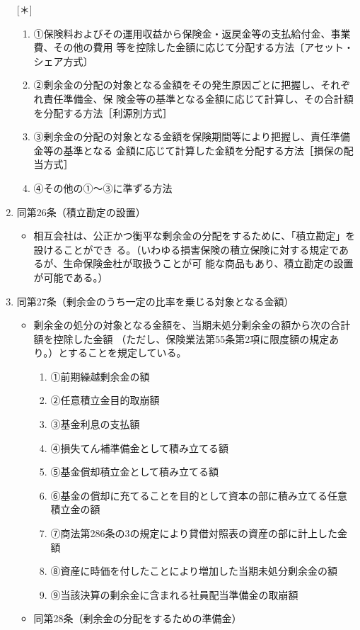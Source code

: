 \documentclass[report,gutter=10mm,fore-edge=10mm,uplatex,dvipdfmx]{jlreq}
\begin{document}
\begin{enumerate} [＊]
\begin{itemize}
\begin{enumerate} [ ]
 \item 
  ①保険料およびその運用収益から保険金・返戻金等の支払給付金、事業費、その他の費用
 等を控除した金額に応じて分配する方法〔アセット・シェア方式〕
 \item 
 ②剰余金の分配の対象となる金額をその発生原因ごとに把握し、それぞれ責任準備金、保
 険金等の基準となる金額に応じて計算し、その合計額を分配する方法［利源別方式］
 \item 
 ③剰余金の分配の対象となる金額を保険期間等により把握し、責任準備金等の基準となる
 金額に応じて計算した金額を分配する方法［損保の配当方式］
 \item 
 ④その他の①〜③に準ずる方法
\end{enumerate}
\end{itemize}
\item 同第26条（積立勘定の設置）
\begin{itemize}
 \item 相互会社は、公正かつ衡平な剰余金の分配をするために、「積立勘定」を設けることができ
 る。（いわゆる損害保険の積立保険に対する規定であるが、生命保険金杜が取扱うことが可
 能な商品もあり、積立勘定の設置が可能である。）
\end{itemize}
\item 同第27条（剰余金のうち一定の比率を乗じる対象となる金額）
\begin{itemize}
 \item 剰余金の処分の対象となる金額を、当期未処分剰余金の額から次の合計額を控除した金額
 （ただし、保険業法第55条第2項に限度額の規定あり。）とすることを規定している。
\begin{enumerate} [ ]
 \item  ①前期繰越剰余金の額
 \item ②任意積立金目的取崩額
\item ③基金利息の支払額
\item ④損失てん補準備金として積み立てる額
\item ⑤基金償却積立金として積み立てる額
\item ⑥基金の償却に充てることを目的として資本の部に積み立てる任意積立金の額
\item ⑦商法第286条の3の規定により貸借対照表の資産の部に計上した金額
\item ⑧資産に時価を付したことにより増加した当期未処分剰余金の額
\item ⑨当該決算の剰余金に含まれる社員配当準備金の取崩額
\end{enumerate}
 \item 同第28条（剰余金の分配をするための準備金）

\end{itemize}
\end{enumerate}
\end{document}
